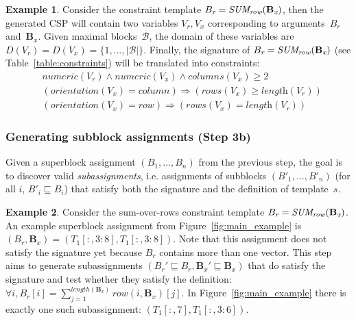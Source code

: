 \documentclass{IEEEtran}
\newcommand{\format}[1]{\textit{#1}\xspace}
\newcommand{\blocks}{\ensuremath{\mathcal{B}}\xspace}
\newcommand{\range}[3]{\ensuremath{#1[#2,#3]}}
\newcommand{\rangeto}[2]{#1{:}#2}
\newcommand{\rangeall}{:}
\newcommand{\eccalc}[2]{\ensuremath{#1 = #2}}
\newcommand{\ecsumr}[2]{\eccalc{#1}{\textit{SUM\textsubscript{row}}(#2)}}
\newcommand{\numeric}{\format{numeric}}
\newcommand{\plength}{\format{length}}
\newcommand{\por}{\format{orientation}}
\newcommand{\prows}{\format{rows}}
\newcommand{\pcols}{\format{columns}}
\newcommand{\sbs}{B}
\newcommand{\sbl}[1]{\ensuremath{\sbs_{\textit{#1}}}}
\newcommand{\ssbl}[1]{\ensuremath{\sbs'_{\textit{#1}}}}
\newcommand{\bsbl}[1]{\ensuremath{\mathbf{\sbs_{\textit{#1}}}}}
\theoremstyle{definition}
\newtheorem{example}{Example}
\begin{document}
\begin{example}

  Consider the constraint template $\ecsumr{\sbl{r}}{\bsbl{x}}$, then the generated CSP will contain two variables $V_r, V_x$ corresponding to arguments~$\sbl{r}$ and~$\bsbl{x}$.
  Given maximal blocks~\blocks, the domain of these variables are $D(V_r) = D(V_x) = \{ 1, \dots, |\blocks| \}$.
  Finally, the signature of $\ecsumr{\sbl{r}}{\bsbl{x}}$ (see Table~\ref{table:constraints}) will be translated into constraints:
  \begin{align*}
    & \numeric(V_r) \land \numeric(V_x) \land \pcols(V_x) \geq 2 \\
    & (\por(V_x) = \mathit{column}) \Rightarrow (\prows(V_x) \geq \plength(V_r)) \\
    & (\por(V_x) = \mathit{row}) \Rightarrow (\prows(V_x) = \plength(V_r))
  \end{align*}
\end{example}





\subsubsection{Generating subblock assignments (Step 3b)}
\label{sec:algo:subgr}
Given a superblock assignment $(\sbl{1}, \dots, \sbl{n})$ from the previous step, the goal is to discover valid \textit{subassignments}, i.e. assignments of subblocks $(\ssbl{1}, \dots, \ssbl{n})$ (for all $i$, $\ssbl{i} \sqsubseteq \sbl{i}$) that satisfy both the signature and the definition of template~$s$.

\begin{example}
  Consider the sum-over-rows constraint template $\ecsumr{\sbl{r}}{\bsbl{x}}$.
  An example superblock assignment from Figure~\ref{fig:main_example} is $(\sbl{r}, \bsbl{x}) = (\range{T_1}{\rangeall}{\rangeto{3}{8}}, \range{T_1}{\rangeall}{\rangeto{3}{8}})$.
  Note that this assignment does not satisfy the signature yet because $\sbl{r}$ contains more than one vector.
  This step aims to generate subassignments $(\sbl{r}' \sqsubseteq \sbl{r}, \mathbf{\sbl{x}}' \sqsubseteq \mathbf{\sbl{x}})$ that do satisfy the signature and test whether they satisfy the definition:
  $\forall i, \sbl{r}[i] = \sum_{j = 1}^{length(\bsbl{x})} \mathit{row}(i, \bsbl{x})[j]$.
  In Figure~\ref{fig:main_example} there is exactly one such subassignment: $(\range{T_1}{\rangeall}{7}, \range{T_1}{\rangeall}{\rangeto{3}{6}})$.
\end{example}
\end{document}
